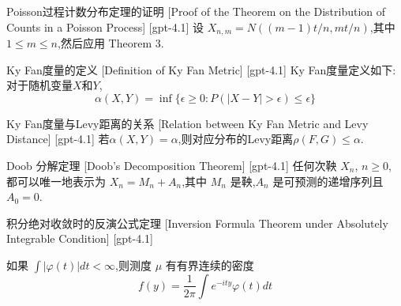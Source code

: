 \documentclass[UTF8]{ctexart}
\begin{document}
    
    
    \begin{prf}
        {Poisson过程计数分布定理的证明}
        [Proof of the Theorem on the Distribution of Counts in a Poisson Process]
        [gpt-4.1]
        设 $X_{n, m} = N((m-1)t/n, mt/n)$,其中 $1 \leq m \leq n$,然后应用 Theorem 3.
    \end{prf}
    
    
    
    \begin{dfn}
        {Ky Fan度量的定义}
        [Definition of Ky Fan Metric]
        [gpt-4.1]
        Ky Fan度量定义如下:对于随机变量$X$和$Y$,
\[
\alpha(X, Y) = \inf\{ \epsilon \geq 0 : P(|X - Y| > \epsilon) \leq \epsilon \}
\]

    \end{dfn}
    
    
    
    \begin{thm}
        {Ky Fan度量与Levy距离的关系}
        [Relation between Ky Fan Metric and Levy Distance]
        [gpt-4.1]
        若$\alpha(X, Y) = \alpha$,则对应分布的Levy距离$\rho(F, G) \leq \alpha$.
    \end{thm}
    
    
    
    \begin{thm}
        {Doob 分解定理}
        [Doob's Decomposition Theorem]
        [gpt-4.1]
        任何次鞅 $X_{n}$, $n \geq 0$, 都可以唯一地表示为 $X_{n} = M_{n} + A_{n}$,其中 $M_{n}$ 是鞅,$A_{n}$ 是可预测的递增序列且 $A_{0} = 0$.
    \end{thm}
    
    
    
    \begin{thm}
        {积分绝对收敛时的反演公式定理}
        [Inversion Formula Theorem under Absolutely Integrable Condition]
        [gpt-4.1]
        
如果 $\int |\varphi(t)| dt < \infty$,则测度 $\mu$ 有有界连续的密度
\[
f(y) = \frac{1}{2\pi} \int e^{-ity} \varphi(t) dt
\]

    \end{thm}
    
    
    
\end{document}
